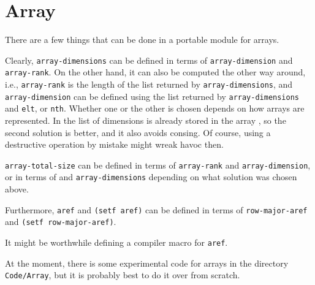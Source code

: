 \chapter{Array}
\label{chap-array}

There are a few things that can be done in a portable module for
arrays. 

Clearly, \texttt{array-dimensions} can be defined in terms of
\texttt{array-dimension} and \texttt{array-rank}. On the other hand,
it can also be computed the other way around, i.e., \texttt{array-rank}
is the length of the list returned by
\texttt{array-dimensions}, and \texttt{array-dimension} can be defined
using the list returned by \texttt{array-dimensions} and
\texttt{elt}, or \texttt{nth}.  Whether one or the other is chosen
depends on how arrays are represented.  In \sysname{} the list of
dimensions is already stored in the array
, so the second solution is
better, and it also avoids consing. Of course, using a destructive
operation by mistake might wreak havoc then.

\texttt{array-total-size} can be defined in terms of
\texttt{array-rank} and \texttt{array-dimension}, or in terms of and
\texttt{array-dimensions} depending on what solution was chosen above.

Furthermore, \texttt{aref} and
\texttt{(setf aref)} can be defined in terms of
\texttt{row-major-aref} and \texttt{(setf row-major-aref)}. 

It might be worthwhile defining a compiler macro for \texttt{aref}. 

At the moment, there is some experimental code for arrays in the
directory \texttt{Code/Array}, but it is probably best to do it over
from scratch. 

